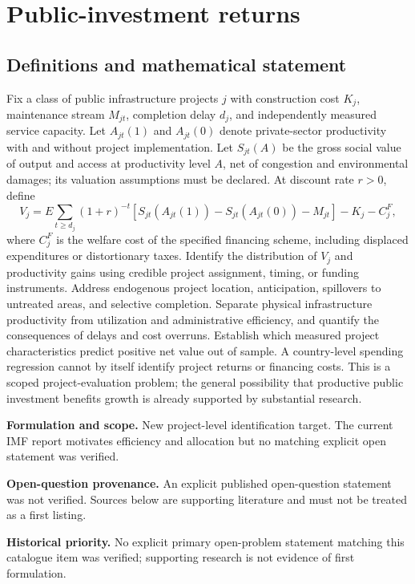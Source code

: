 \documentclass[11pt]{article}
\begin{document}
\section*{Public-investment returns}\label{30007533}
\subsection{Definitions and mathematical statement}
Fix a class of public infrastructure projects \(j\) with construction cost \(K_j\), maintenance stream \(M_{jt}\), completion delay \(d_j\), and independently measured service capacity. Let \(A_{jt}(1)\) and \(A_{jt}(0)\) denote private-sector productivity with and without project implementation. Let \(S_{jt}(A)\) be the gross social value of output and access at productivity level \(A\), net of congestion and environmental damages; its valuation assumptions must be declared. At discount rate \(r>0\), define
\[
V_j=E\sum_{t\ge d_j}(1+r)^{-t}
[S_{jt}(A_{jt}(1))-S_{jt}(A_{jt}(0))-M_{jt}]
-K_j-C_j^F,
\]
where \(C_j^F\) is the welfare cost of the specified financing scheme, including displaced expenditures or distortionary taxes.
Identify the distribution of \(V_j\) and productivity gains using credible project assignment, timing, or funding instruments. Address endogenous project location, anticipation, spillovers to untreated areas, and selective completion. Separate physical infrastructure productivity from utilization and administrative efficiency, and quantify the consequences of delays and cost overruns. Establish which measured project characteristics predict positive net value out of sample. A country-level spending regression cannot by itself identify project returns or financing costs. This is a scoped project-evaluation problem; the general possibility that productive public investment benefits growth is already supported by substantial research.

\par\textbf{Formulation and scope.} New project-level identification target. The current IMF report motivates efficiency and allocation but no matching explicit open statement was verified.

\par\textbf{Open-question provenance.} An explicit published open-question statement was not verified. Sources below are supporting literature and must not be treated as a first listing.

\par\textbf{Historical priority.} No explicit primary open-problem statement matching this catalogue item was verified; supporting research is not evidence of first formulation.
\end{document}

